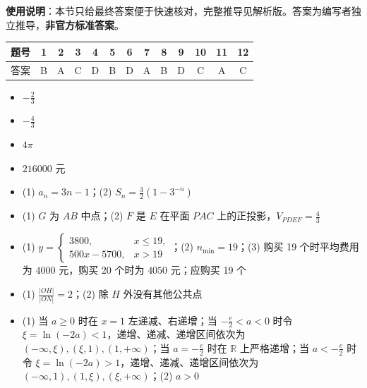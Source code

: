 
\begin{gknotice}
\textbf{使用说明}：本节只给最终答案便于快速核对，完整推导见解析版。答案为编写者独立推导，\textbf{非官方标准答案}。
\end{gknotice}

\begin{center}\begin{tabular}{ccccccccccccc}
\toprule
题号 & 1 & 2 & 3 & 4 & 5 & 6 & 7 & 8 & 9 & 10 & 11 & 12 \\
\midrule
答案 & B & A & C & D & B & D & A & B & D & C & A & C \\
\bottomrule
\end{tabular}\end{center}

\begin{itemize}[leftmargin=2.6em]
  \item[\textbf{13.}] \(-\frac23\)
  \item[\textbf{14.}] \(-\frac43\)
  \item[\textbf{15.}] \(4\pi\)
  \item[\textbf{16.}] \(216000\) 元
\end{itemize}

\begin{itemize}[leftmargin=2.6em]
  \item[\textbf{17.}] (1) \(a_n=3n-1\)；(2) \(S_n=\frac32(1-3^{-n})\)
  \item[\textbf{18.}] (1) \(G\) 为 \(AB\) 中点；(2) \(F\) 是 \(E\) 在平面 \(PAC\) 上的正投影，\(V_{PDEF}=\frac43\)
  \item[\textbf{19.}] (1) $y=\begin{cases}3800,&x\le19,\\500x-5700,&x>19\end{cases}$；(2) \(n_{\min}=19\)；(3) 购买 19 个时平均费用为 \(4000\) 元，购买 20 个时为 \(4050\) 元；应购买 19 个
  \item[\textbf{20.}] (1) \(\frac{|OH|}{|ON|}=2\)；(2) 除 \(H\) 外没有其他公共点
  \item[\textbf{21.}] (1) 当 \(a\ge0\) 时在 \(x=1\) 左递减、右递增；当 \(-\frac e2<a<0\) 时令 \(\xi=\ln(-2a)<1\)，递增、递减、递增区间依次为 \((-\infty,\xi),(\xi,1),(1,+\infty)\)；当 \(a=-\frac e2\) 时在 \(\mathbb R\) 上严格递增；当 \(a<-\frac e2\) 时令 \(\xi=\ln(-2a)>1\)，递增、递减、递增区间依次为 \((-\infty,1),(1,\xi),(\xi,+\infty)\)；(2) \(a>0\)
\end{itemize}

